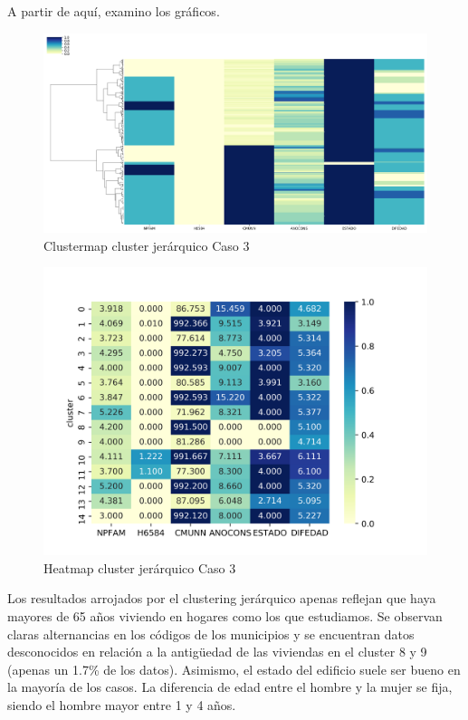 A partir de aquí, examino los gráficos.

\begin{figure}[H] %
	\centering
	\includegraphics[scale=0.38]{clustermap3.png}  %
	\caption{Clustermap cluster jerárquico Caso 3} 
	\label{fig:clustermap-caso3}
\end{figure}

\begin{figure}[H] %
	\centering
	\includegraphics[scale=0.8]{heatmap-jerarquico3.png}  %
	\caption{Heatmap cluster jerárquico Caso 3} 
	\label{fig:heatmapj-caso3}
\end{figure}

Los resultados arrojados por el clustering jerárquico apenas reflejan que haya mayores de 65 años viviendo en hogares como los que estudiamos. Se observan claras alternancias en los códigos de los municipios y se encuentran datos desconocidos en relación a la antigüedad de las viviendas en el cluster 8 y 9 (apenas un 1.7\% de los datos). Asimismo, el estado del edificio suele ser bueno en la mayoría de los casos. La diferencia de edad entre el hombre y la mujer se fija, siendo el hombre mayor entre 1 y 4 años.


